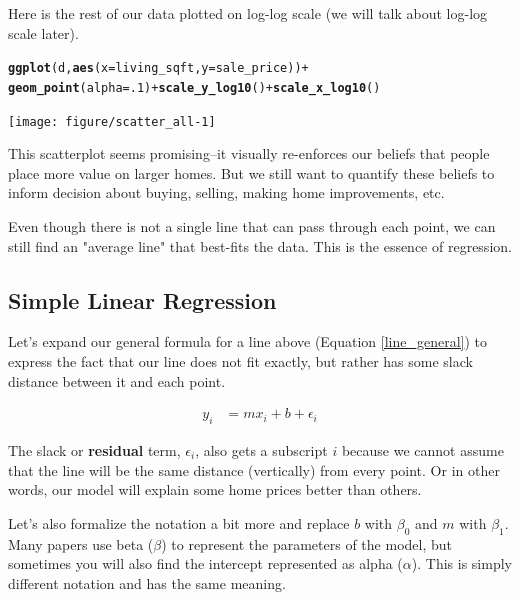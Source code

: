 \documentclass[10pt]{article}\usepackage[]{graphicx}\usepackage[]{color}
\makeatletter
\newcommand{\hlnum}[1]{\textcolor[rgb]{0.686,0.059,0.569}{#1}}%
\newcommand{\hlopt}[1]{\textcolor[rgb]{0,0,0}{#1}}%
\newcommand{\hlstd}[1]{\textcolor[rgb]{0.345,0.345,0.345}{#1}}%
\newcommand{\hlkwc}[1]{\textcolor[rgb]{0.333,0.667,0.333}{#1}}%
\newcommand{\hlkwd}[1]{\textcolor[rgb]{0.737,0.353,0.396}{\textbf{#1}}}%
\newenvironment{kframe}{%
 \def\at@end@of@kframe{}%
 \ifinner\ifhmode%
  \def\at@end@of@kframe{\end{minipage}}%
  \begin{minipage}{\columnwidth}%
 \fi\fi%
 \def\FrameCommand##1{\hskip\@totalleftmargin \hskip-\fboxsep
 \colorbox{shadecolor}{##1}\hskip-\fboxsep
     \hskip-\linewidth \hskip-\@totalleftmargin \hskip\columnwidth}%
 \MakeFramed {\advance\hsize-\width
   \@totalleftmargin\z@ \linewidth\hsize
   \@setminipage}}%
 {\par\unskip\endMakeFramed%
 \at@end@of@kframe}
\newenvironment{knitrout}{}{} %
\makeatother
\begin{document}
Here is the rest of our data plotted on log-log scale (we will talk about log-log scale later).

\begin{knitrout}\small
{}\color{fgcolor}\begin{kframe}
\begin{alltt}
\hlkwd{ggplot}\hlstd{(d,}\hlkwd{aes}\hlstd{(}\hlkwc{x}\hlstd{=living_sqft,}\hlkwc{y}\hlstd{=sale_price))} \hlopt{+}
  \hlkwd{geom_point}\hlstd{(}\hlkwc{alpha}\hlstd{=}\hlnum{.1}\hlstd{)} \hlopt{+} \hlkwd{scale_y_log10}\hlstd{()} \hlopt{+} \hlkwd{scale_x_log10}\hlstd{()}
\end{alltt}
\end{kframe}

{\centering \texttt{[image: figure/scatter\_all-1]} 

}



\end{knitrout}

This scatterplot seems promising--it visually re-enforces our beliefs that people place more value on larger homes. But we still want to quantify these beliefs to inform decision about buying, selling, making home improvements, etc.

Even though there is not a single line that can pass through each point, we can still find an "average line" that best-fits the data. This is the essence of regression.

\subsection*{Simple Linear Regression}

Let's expand our general formula for a line above (Equation \ref{line_general}) to express the fact that our line does not fit exactly, but rather has some slack distance between it and each point. 

\begin{align}
y_i &= mx_i + b + \epsilon_i
\end{align}

The slack or {\bf residual } term, $\epsilon_i$, also gets a subscript $i$ because we cannot assume that the line will be the same distance (vertically) from every point. Or in other words, our model will explain some home prices better than others. 

Let's also formalize the notation a bit more and replace $b$ with $\beta_0$ and $m$ with $\beta_1$. Many papers use beta ($\beta$) to represent the parameters of the model, but sometimes you will also find the intercept represented as alpha ($\alpha$). This is simply different notation and has the same meaning. 
\end{document}
